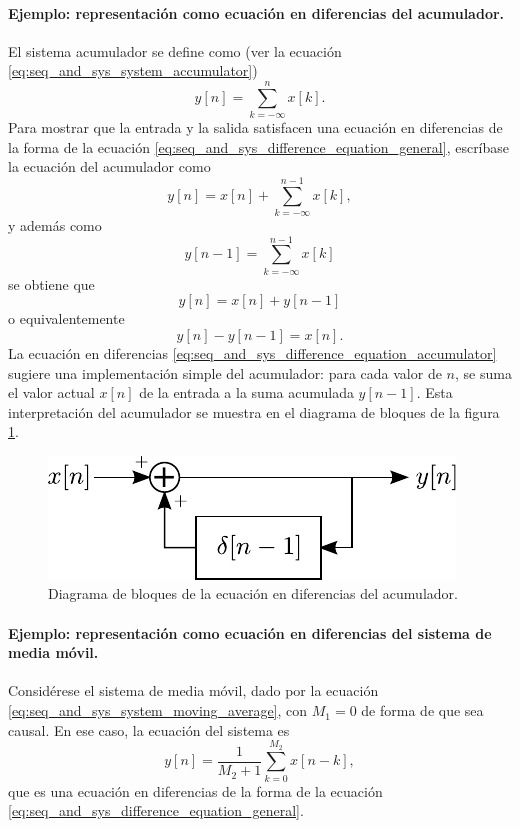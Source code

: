 \documentclass[a4paper]{report}
\begin{document}
\paragraph{Ejemplo: representación como ecuación en diferencias del acumulador.} El sistema acumulador se define como (ver la ecuación \ref{eq:seq_and_sys_system_accumulator})
\[
 y[n]=\sum_{k=-\infty}^nx[k]. 
\]
Para mostrar que la entrada y la salida satisfacen una ecuación en diferencias de la forma de la ecuación \ref{eq:seq_and_sys_difference_equation_general}, escríbase la ecuación del acumulador como
\[
 y[n]=x[n]+\sum_{k=-\infty}^{n-1}x[k],
\]
y además como
\[
 y[n-1]=\sum_{k=-\infty}^{n-1}x[k]
\]
se obtiene que 
\begin{equation}\label{eq:seq_and_sys_difference_equation_accumulator}
 y[n]=x[n]+y[n-1] 
\end{equation}
o equivalentemente
\[
 y[n]-y[n-1]=x[n].
\]
La ecuación en diferencias \ref{eq:seq_and_sys_difference_equation_accumulator} sugiere una implementación simple del acumulador: para cada valor de \(n\), se suma el valor actual \(x[n]\) de la entrada a la suma acumulada \(y[n-1]\). Esta interpretación del acumulador se muestra en el diagrama de bloques de la figura \ref{fig:difference_equation_accumulator_blocks}.
 \begin{figure}[!htb]
  \begin{minipage}[c]{0.35\textwidth}
    \includegraphics[width=\textwidth]{figuras/difference_equation_accumulator_blocks.pdf}
  \end{minipage}\hfill
  \begin{minipage}[c]{0.55\textwidth}
    \caption{
     Diagrama de bloques de la ecuación en diferencias del acumulador.
    }\label{fig:difference_equation_accumulator_blocks}
  \end{minipage}
\end{figure}

\paragraph{Ejemplo: representación como ecuación en diferencias del sistema de media móvil.} Considérese el sistema de media móvil, dado por la ecuación \ref{eq:seq_and_sys_system_moving_average}, con \(M_1=0\) de forma de que sea causal. En ese caso, la ecuación del sistema es
\begin{equation}\label{eq:seq_and_sys_system_moving_average_causal}
  y[n]=\frac{1}{M_2+1}\sum_{k=0}^{M_2}x[n-k],
\end{equation}
que es una ecuación en diferencias de la forma de la ecuación \ref{eq:seq_and_sys_difference_equation_general}.
\end{document}
